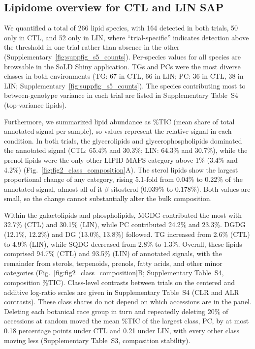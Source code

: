 \documentclass[9pt,twocolumn,twoside]{rilabRxiv}
\begin{document}
\subsection*{Lipidome overview for CTL and LIN SAP}

We quantified a total of 266 lipid species, with 164 detected in both trials, 50 only in CTL, and 52 only in LIN, where ``trial-specific'' indicates detection above the threshold in one trial rather than absence in the other (Supplementary~\ref{fig:suppfig_s5_counts}). Per-species values for all species are browsable in the SoLD Shiny application. TGs and PCs were the most diverse classes in both environments (TG: 67 in CTL, 66 in LIN; PC: 36 in CTL, 38 in LIN; Supplementary~\ref{fig:suppfig_s5_counts}). The species contributing most to between-genotype variance in each trial are listed in Supplementary Table~S4 (top-variance lipids).

Furthermore, we summarized lipid abundance as \%TIC (mean share of total annotated signal per sample), so values represent the relative signal in each condition. In both trials, the glycerolipids and glycerophospholipids dominated the annotated signal (CTL: 65.4\% and 30.3\%; LIN: 64.3\% and 30.7\%), while the prenol lipids were the only other LIPID MAPS category above 1\% (3.4\% and 4.2\%) (Fig.~\ref{fig:fig2_class_composition}A). The sterol lipids show the largest proportional change of any category, rising 5.1-fold from 0.04\% to 0.22\% of the annotated signal, almost all of it \textit{$\beta$}-sitosterol (0.039\% to 0.178\%). Both values are small, so the change cannot substantially alter the bulk composition.

Within the galactolipids and phospholipids, MGDG contributed the most with 32.7\% (CTL) and 30.1\% (LIN), while PC contributed 24.2\% and 23.3\%. DGDG (12.1\%, 12.2\%) and DG (13.0\%, 13.8\%) followed. TG increased from 2.6\% (CTL) to 4.9\% (LIN), while SQDG decreased from 2.8\% to 1.3\%. Overall, these lipids comprised 94.7\% (CTL) and 93.5\% (LIN) of annotated signals, with the remainder from sterols, terpenoids, prenols, fatty acids, and other minor categories (Fig.~\ref{fig:fig2_class_composition}B; Supplementary Table~S4, composition \%TIC). Class-level contrasts between trials on the centered and additive log-ratio scales are given in Supplementary Table~S4 (CLR and ALR contrasts). These class shares do not depend on which accessions are in the panel. Deleting each botanical race group in turn and repeatedly deleting 20\% of accessions at random moved the mean \%TIC of the largest class, PC, by at most 0.18 percentage points under CTL and 0.21 under LIN, with every other class moving less (Supplementary Table~S3, composition stability). 
\end{document}
